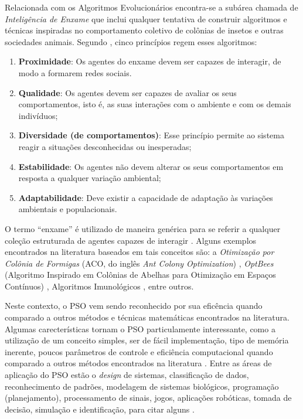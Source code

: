 \documentclass[
	12pt,				%
	openany,			%
	oneside,	
	a4paper,			%
	brazil,				%
	]{unimontes-ppgmsc-abntex2}
\begin{document}
Relacionada com os Algoritmos Evolucionários encontra-se a subárea chamada de {\em Inteligência de Enxame} que inclui qualquer tentativa de construir algoritmos e técnicas inspiradas no comportamento coletivo de colônias de insetos e outras sociedades animais. Segundo , cinco princípios regem esses algoritmos:

\begin{enumerate}[label=(\roman*)]
\item \textbf{Proximidade}: Os agentes do enxame devem ser capazes de interagir, de modo a formarem redes sociais.
\item \textbf{Qualidade}: Os agentes devem ser capazes de avaliar os seus comportamentos, isto é, as suas interações com o ambiente e com os demais indivíduos;
\item \textbf{Diversidade (de comportamentos)}: Esse princípio permite ao sistema reagir a situações desconhecidas ou inesperadas;
\item \textbf{Estabilidade}: Os agentes não devem  alterar os seus comportamentos em resposta a qualquer variação ambiental;
\item \textbf{Adaptabilidade}: Deve existir a capacidade de adaptação às variações ambientais e populacionais.
\end{enumerate}

O termo ``enxame'' é utilizado de maneira genérica para se  referir a qualquer coleção estruturada de agentes capazes de interagir \cite{VonZuben_2007}. Alguns exemplos encontrados na literatura baseados em tais conceitos são: a {\em Otimização por Colônia de Formigas} (ACO, do inglês {\em Ant Colony Optimization}) \cite{Dorigo_1996}, {\em OptBees} (Algoritmo Inspirado em Colônias de Abelhas para Otimização em Espaços Contínuos) \cite{Renato_2013}, Algoritmos Imunológicos \cite{Castro_2002}, entre outros. 

Neste contexto, o PSO vem sendo reconhecido por sua eficência quando comparado a outros métodos e técnicas matemáticas encontrados na literatura. Algumas carecterísticas tornam o PSO particulamente interessante, como a utilização de um conceito simples, ser de fácil implementação, tipo de memória inerente, poucos parâmetros de controle e eficiência computacional quando comparado a outros métodos encontrados na literatura \cite{Valle_2008}. Entre as áreas de aplicação do PSO estão o {\em design} de sistemas, classificação de dados, reconhecimento de padrões, modelagem de sistemas biológicos, programação (planejamento), processamento de sinais, jogos, aplicações robóticas, tomada de decisão, simulação e identificação, para citar alguns \cite{Kennedy_2001}.
  
\end{document}
